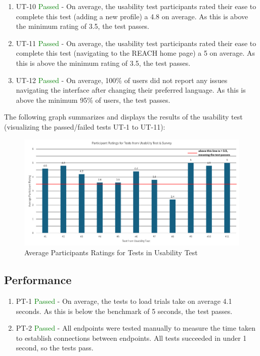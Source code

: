 \documentclass[12pt, titlepage]{article}
\begin{document}
\begin{enumerate}
  \item UT-10 \textcolor{green}{Passed} - On average, the usability test participants rated their ease to complete this test (adding a new profile) a 4.8 on average. As this is above the minimum rating of 3.5, the test passes.
  \item UT-11 \textcolor{green}{Passed} - On average, the usability test participants rated their ease to complete this test (navigating to the REACH home page) a 5 on average. As this is above the minimum rating of 3.5, the test passes.
  \item UT-12 \textcolor{green}{Passed} - On average, 100\% of users did not report any issues navigating the interface after changing their preferred language. As this is above the minimum 95\% of users, the test passes.
\end{enumerate}

\noindent The following graph summarizes and displays the results of the usability test (visualizing the passed/failed tests UT-1 to UT-11):

\begin{figure}[H]
  \centering
  \includegraphics[width=1\linewidth]{images/AverageRatingsUT.png}
  \caption{Average Participants Ratings for Tests in Usability Test}
  \label{fig:figure1}
\end{figure}

\subsection{Performance}
\begin{enumerate}
  \item PT-1 \textcolor{green}{Passed} - On average, the tests to load trials take on average 4.1 seconds. As this is below the benchmark of 5 seconds, the test passes.
  \item PT-2 \textcolor{green}{Passed} - All endpoints were tested manually to measure the time taken to establish connections between endpoints. All tests succeeded in under 1 second, so the tests pass.
\end{enumerate}
\end{document}
